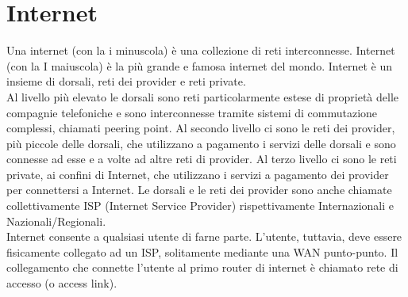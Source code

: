 \documentclass[12pt]{report}
\begin{document}
	\section{Internet}
	Una internet (con la i minuscola) è una collezione di reti interconnesse. Internet (con la I maiuscola) è la più grande e famosa internet del mondo. Internet è un insieme di dorsali, reti dei provider e reti private. 
	\vspace{\baselineskip}\\
	Al livello più elevato le dorsali sono reti particolarmente estese di proprietà delle compagnie telefoniche e sono interconnesse tramite sistemi di commutazione complessi, chiamati peering point. Al secondo livello ci sono le reti dei provider, più piccole delle dorsali, che utilizzano a pagamento i servizi delle dorsali e sono connesse ad esse e a volte ad altre reti di provider. Al terzo livello ci sono le reti private, ai confini di Internet, che utilizzano i servizi a pagamento dei provider per connettersi a Internet. Le dorsali e le reti dei provider sono anche chiamate collettivamente ISP (Internet Service Provider) rispettivamente Internazionali e Nazionali/Regionali.
	\vspace{\baselineskip}\\
	Internet consente a qualsiasi utente di farne parte. L'utente, tuttavia, deve essere fisicamente collegato ad un ISP, solitamente mediante una WAN punto-punto. Il collegamento che connette l'utente al primo router di internet è chiamato rete di accesso (o access link).
\end{document}
